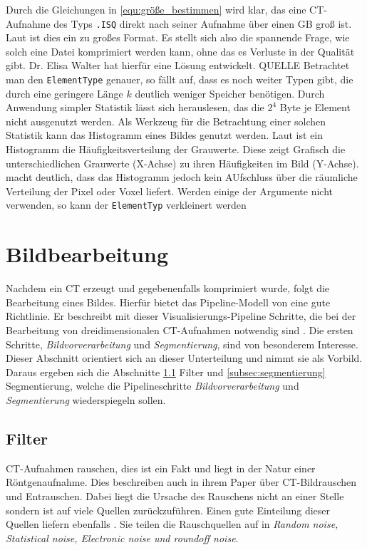 Durch die Gleichungen in \ref{equ:größe_bestimmen} wird klar, das eine CT-Aufnahme
des Typs \texttt{.ISQ} direkt nach seiner Aufnahme über einen GB groß ist. Laut
\citet{poliklinikLMU} ist dies ein zu großes Format. Es stellt sich also die
spannende Frage, wie solch eine Datei komprimiert werden kann, ohne das es
Verluste in der Qualität gibt. Dr. Elisa Walter hat hierfür eine Lösung
entwickelt. QUELLE Betrachtet man den \texttt{ElementType} genauer, so fällt auf,
dass es noch weiter Typen gibt, die durch eine geringere Länge $k$ deutlich weniger
Speicher benötigen. Durch Anwendung simpler Statistik lässt sich herauslesen, das
die $2^{4}$ Byte je Element nicht ausgenutzt werden. Als Werkzeug für die
Betrachtung einer solchen Statistik kann das Histogramm eines Bildes genutzt
werden. Laut \citet[Seite 249]{jahne2024} ist ein Histogramm die Häufigkeitsverteilung
der Grauwerte. Diese zeigt Grafisch die unterschiedlichen Grauwerte (X-Achse) zu
ihren Häufigkeiten im Bild (Y-Achse). \citet[Seite 249]{jahne2024} macht deutlich,
dass das Histogramm jedoch kein AUfschluss über die räumliche Verteilung der
Pixel oder Voxel liefert. Werden einige der Argumente nicht verwenden, so kann
der \texttt{ElementTyp} verkleinert werden

\section{Bildbearbeitung}
\label{sec:bildbearbeitung} Nachdem ein CT erzeugt und gegebenenfalls
komprimiert wurde, folgt die Bearbeitung eines Bildes. Hierfür bietet das
Pipeline-Modell von \citet[Seite 50]{handels2000} eine gute Richtlinie. Er beschreibt
mit dieser Visualisierungs-Pipeline Schritte, die bei der Bearbeitung von
dreidimensionalen CT-Aufnahmen notwendig sind \citep[vgl.][Seite 50]{handels2000}.
Die ersten Schritte, \textit{Bildvorverarbeitung} und \textit{Segmentierung}, sind
von besonderem Interesse. Dieser Abschnitt orientiert sich an dieser
Unterteilung und nimmt sie als Vorbild. Daraus ergeben sich die Abschnitte \ref{subsec:filter}
Filter und \ref{subsec:segmentierung} Segmentierung, welche die Pipelineschritte
\textit{Bildvorverarbeitung} und \textit{Segmentierung} wiederspiegeln sollen.

\subsection{Filter}
\label{subsec:filter} CT-Aufnahmen rauschen, dies ist ein Fakt und liegt in der Natur
einer Röntgenaufnahme. Dies beschreiben auch \citet[Kapitel 3]{diwakar2018} in
ihrem Paper über CT-Bildrauschen und Entrauschen. Dabei liegt die Ursache des Rauschens
nicht an einer Stelle sondern ist auf viele Quellen zurückzuführen. Einen gute
Einteilung dieser Quellen liefern ebenfalls \citet[Kapitel 3]{diwakar2018}. Sie teilen
die Rauschquellen auf in \textit{Random noise, Statistical noise, Electronic
noise und roundoff noise}.

